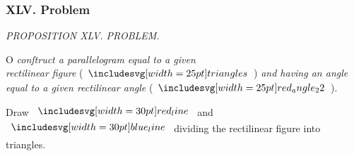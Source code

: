 \documentclass[12pt,preview]{standalone}
\begin{document}
\subsubsection{XLV. Problem}

\begin{minipage}[t]{0.33\textwidth}
    \vspace{40pt}
    
\end{minipage}%
\hfill
\begin{minipage}[t]{0.64\textwidth}
    \vspace{0pt}

    \begin{center}
        \textit{PROPOSITION XLV. PROBLEM.}\label{book1pr45} \\
    \end{center}

    \hfill

    \begin{center}
        \raggedright \lettrine[lines=4, loversize=1, nindent=0pt]{}{}O \textit{conſtruct a parallelogram equal to a given\\ rectilinear figure} (\hspace{-1ex}$\img{triangles}$\hspace{-1ex}) \textit{and having an angle\\ equal to a given rectilinear angle} (\hspace{-1ex}$\img{red_angle_22}$\hspace{-1ex}).
    \end{center}

    \hfill

    \hfill

    \begin{center}
        Draw $\redline$ and $\blueline$ dividing the rectilinear figure into triangles.
    \end{center}

    \hfill


\end{minipage}
\end{document}
